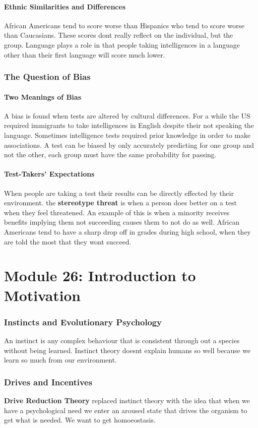 \documentclass[12pt]{article}
\begin{document}
\subsection*{Ethnic Similarities and Differences}
African Americans tend to score worse than Hispanics who tend to score worse than Caucasians. These scores dont really reflect on the individual, but the group. Language plays a role in that people taking intelligences in a language other than their first language will score much lower. 
\section*{The Question of Bias}
\subsection*{Two Meanings of Bias}
A bias is found when tests are altered by cultural differences. For a while the US required immigrants to take intelligences in English despite their not speaking the language. Sometimes intelligence tests required prior knowledge in order to make associations. A test can be biased by only accurately predicting for one group and not the other, each group must have the same probability for passing.
\subsection*{Test-Takers' Expectations}
When people are taking a test their results can be directly effected by their environment. the \textbf{stereotype threat} is when a person does better on a test when they feel threatened. An example of this is when a minority receives benefits implying them not succeeding causes them to not do as well. African Americans tend to have a sharp drop off in grades during high school, when they are told the most that they wont succeed. 

\part*{Module 26: Introduction to Motivation}
\section*{Instincts and Evolutionary Psychology}
An instinct is any complex behaviour that is consistent through out a species without being learned. Instinct theory doesnt explain humans so well because we learn so much from our environment.
\section*{Drives and Incentives}
\textbf{Drive Reduction Theory} replaced instinct theory with the idea that when we have a psychological need we enter an aroused state that drives the organism to get what is needed. We want to get homoeostasis. 
\end{document}

